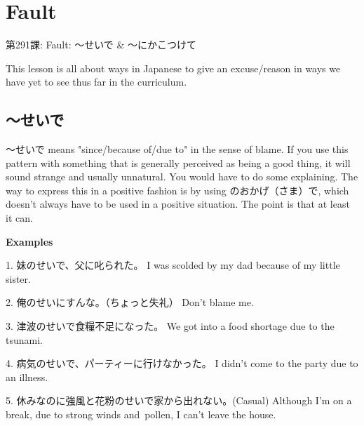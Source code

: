     
\chapter{Fault}

\begin{center}
\begin{Large}
第291課: Fault: ～せいで \& ～にかこつけて 
\end{Large}
\end{center}
 
\par{ This lesson is all about ways in Japanese to give an excuse\slash reason in ways we have yet to see thus far in the curriculum. }
      
\section{～せいで}
 
\par{ ～せいで means "since\slash because of\slash due to" in the sense of blame. If you use this pattern with something that is generally perceived as being a good thing, it will sound strange and usually unnatural. You would have to do some explaining. The way to express this in a positive fashion is by using のおかげ（さま）で, which doesn't always have to be used in a positive situation. The point is that at least it can. }
 
\begin{center}
\textbf{Examples }
\end{center}

\par{1. 妹のせいで、父に叱られた。 \hfill\break
I was scolded by my dad because of my little sister. }
 
\par{2. 俺のせいにすんな。（ちょっと失礼） \hfill\break
Don't blame me. }
 
\par{3. 津波のせいで食糧不足になった。 \hfill\break
We got into a food shortage due to the tsunami. }
 
\par{4. 病気のせいで、パーティーに行けなかった。 \hfill\break
I didn't come to the party due to an illness. }
 
\par{5. 休みなのに強風と花粉のせいで家から出れない。(Casual) \hfill\break
Although I'm on a break, due to strong winds and pollen, I can't leave the house. }
 
